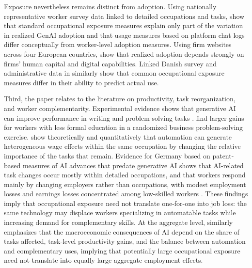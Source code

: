 Exposure nevertheless remains distinct from adoption. Using nationally representative worker survey data linked to detailed occupations and tasks, \citet{bick_et_al_2026} show that standard occupational exposure measures explain only part of the variation in realized GenAI adoption and that usage measures based on platform chat logs differ conceptually from worker-level adoption measures. Using firm websites across four European countries, \citet{garbers_gregory_2026} show that realized adoption depends strongly on firms' human capital and digital capabilities. Linked Danish survey and administrative data in \citet{pulito_et_al_2026} similarly show that common occupational exposure measures differ in their ability to predict actual use.


Third, the paper relates to the literature on productivity, task reorganization, and worker complementarity. Experimental evidence shows that generative AI can improve performance in writing and problem-solving tasks \citep{noy_zhang_2023}. \citet{cruces_et_al_2026} find larger gains for workers with less formal education in a randomized business problem-solving exercise. \citet{freund_mann_2026} show theoretically and quantitatively that automation can generate heterogeneous wage effects within the same occupation by changing the relative importance of the tasks that remain. Evidence for Germany based on patent-based measures of AI advances that predate generative AI shows that AI-related task changes occur mostly within detailed occupations, and that workers respond mainly by changing employers rather than occupations, with modest employment losses and earnings losses concentrated among low-skilled workers \citep{gathmann2024ai}. These findings imply that occupational exposure need not translate one-for-one into job loss: the same technology may displace workers specializing in automatable tasks while increasing demand for complementary skills. At the aggregate level, \citet{acemoglu_2025} similarly emphasizes that the macroeconomic consequences of AI depend on the share of tasks affected, task-level productivity gains, and the balance between automation and complementary uses, implying that potentially large occupational exposure need not translate into equally large aggregate employment effects.

